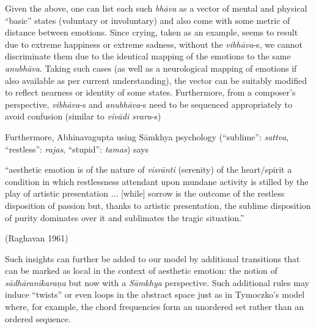 Given the above, one can list each such \textsl{bhāva} as a vector of mental and physical “basic” states (voluntary or involuntary) and also come with some metric of distance between emotions. Since crying, taken as an example, seems to result due to extreme happiness or extreme sadness, without the \textsl{vibhāva}-s, we cannot discriminate them due to the identical mapping of the emotions to the same \textsl{anubhāva}. Taking such cases (as well as a neurological mapping of emotions if also available as per current understanding), the vector can be suitably modified to reflect nearness or identity of some states. Furthermore, from a composer’s perspective, \textsl{vibhāva}-s and \textsl{anubhāva}-s need to be sequenced appropriately to avoid confusion (similar to \textsl{vivādi} \textsl{svara}-s)

Furthermore, Abhinavagupta using Sāmkhya psychology (“sublime”: \textsl{sattva}, “restless”: \textsl{rajas}, “stupid”: \textsl{tamas}) says

\begin{myquote}
“aesthetic emotion is of the nature of \textsl{visrānti} (serenity) of the heart/spirit a condition in which restlessness attendant upon mundane activity is stilled by the play of artistic presentation ... [while] sorrow is the outcome of the restless disposition of passion but, thanks to artistic presentation, the sublime disposition of purity dominates over it and sublimates the tragic situation.” 

\hfill(Raghavan 1961)
\end{myquote}

Such insights can further be added to our model by additional transitions that can be marked as local in the context of aesthetic emotion: the notion of \textsl{sādhāranīkaraṇa} but now with a \textsl{Sāmkhya} perspective. Such additional rules may induce “twists” or even loops in the abstract space just as in Tymoczko’s model where, for example, the chord frequencies form an unordered set rather than an ordered sequence.

